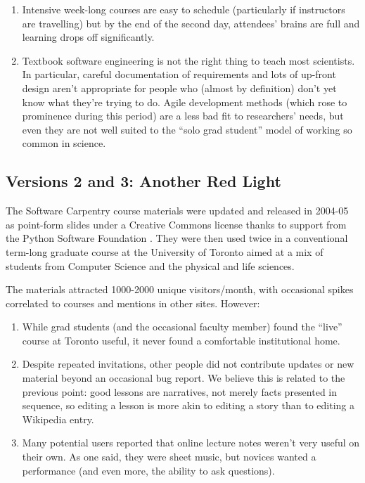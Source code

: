 \documentclass[10pt,a4paper,twocolumn]{article}
\begin{document}
\begin{enumerate}
\item
  Intensive week-long courses are easy to schedule (particularly if
  instructors are travelling) but by the end of the second day,
  attendees' brains are full and learning drops off significantly.
\item
  Textbook software engineering is not the right thing to teach most
  scientists. In particular, careful documentation of requirements and
  lots of up-front design aren't appropriate for people who (almost by
  definition) don't yet know what they're trying to do. Agile
  development methods (which rose to prominence during this period) are
  a less bad fit to researchers' needs, but even they are not well
  suited to the ``solo grad student'' model of working so common in
  science.
\end{enumerate}

\subsection*{Versions 2 and 3: Another Red Light}

The Software Carpentry course materials were updated and released in
2004-05 as point-form slides under a Creative Commons license thanks to
support from the Python Software Foundation \cite{wilson2006b}. They were
then used twice in a conventional term-long graduate course at the
University of Toronto aimed at a mix of students from Computer Science
and the physical and life sciences.

The materials attracted 1000-2000 unique visitors/month, with occasional
spikes correlated to courses and mentions in other sites. However:

\begin{enumerate}
\item
  While grad students (and the occasional faculty member) found the
  ``live'' course at Toronto useful, it never found a comfortable
  institutional home.
\item
  Despite repeated invitations, other people did not contribute updates
  or new material beyond an occasional bug report. We believe this is
  related to the previous point: good lessons are narratives, not merely
  facts presented in sequence, so editing a lesson is more akin to
  editing a story than to editing a Wikipedia entry.
\item
  Many potential users reported that online lecture notes weren't very
  useful on their own. As one said, they were sheet music, but novices
  wanted a performance (and even more, the ability to ask questions).
\end{enumerate}
\end{document}
